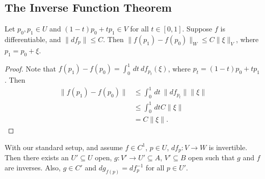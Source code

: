 \subsection{The Inverse Function Theorem}
\begin{prop}
    Let $p_0,p_1\in U$ and $(1-t)p_0+tp_1\in V$ for all $t \in [0,1]$. Suppose $f$ is differentiable, and $\|df_p\|\leq C$. Then $\|f(p_1)-f(p_0)\|_W \leq C\|\xi \|_V$, where $p_1=p_0+\xi$.
\end{prop}
\begin{proof}
    Note that $f(p_1)-f(p_0)= \int_{0}^{1}  \, dt \ df_{p_t} (\xi)$, where $p_t= (1-t)p_0+tp_1$. Then 
    \begin{align*}
        \| f(p_1)-f(p_0)\|&\leq  \int_{0}^{1}  \, dt \ \|df_{p_t}\|\|\xi\|\\
                          &\leq \int_{0}^{1}  \, dt C \|\xi\|\\
                          &=C \|\xi\|.
    \end{align*}
\end{proof}
\begin{theorem}
    With our standard setup, and assume $f \in C^1$, $p \in U$, $df_p \colon V \to W$ is invertible. Then there exists an $U' \subseteq U$ open, $g \colon V' \to U' \subseteq A$, $V' \subseteq B$ open such that $g$ and $f$ are inverses. Also, $g \in C'$ and $ dg_{f(p)} = df^{-1} _p$ for all $p \in U'$. 
\end{theorem}
